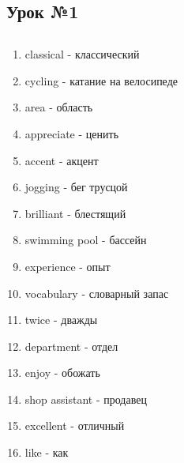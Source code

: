 \subsection{Урок №1}

\subsection*{}
\begin{multicols}{2}
    \begin{enumerate}\setlength{\itemsep}{0pt}
        \item classical - классический
        \item cycling - катание на велосипеде
        \item area - область
        \item appreciate - ценить
        \item accent - акцент
        \item jogging - бег трусцой
        \item brilliant - блестящий
        \item swimming pool - бассейн
        \item experience - опыт
        \item vocabulary - словарный запас
        \item twice - дважды
        \item department - отдел
        \item enjoy - обожать
        \item shop assistant - продавец
        \item excellent - отличный
        \item like - как
    \end{enumerate}
\end{multicols}

\subsection*{}

\begin{verbatim}
\end{verbatim}